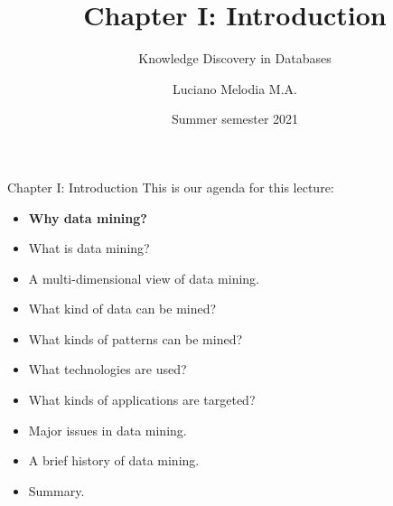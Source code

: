 \documentclass[aspectratio=169,t]{beamer}
\title[KDD]{Chapter I: Introduction}
\subtitle{Knowledge Discovery in Databases}
\author[L.~Melodia]{Luciano Melodia M.A.}
\institute[Department]{Evolutionary Data Management, Friedrich-Alexander University Erlangen-Nürnberg}
\date{Summer semester 2021}
\begin{document}
  \maketitle

  { 
    \begin{frame}{Chapter I: Introduction}
    This is our agenda for this lecture:
        \begin{itemize}
            \item \textbf{Why data mining?}
            \item What is data mining?
            \item A multi-dimensional view of data mining.
            \item What kind of data can be mined?
            \item What kinds of patterns can be mined?
            \item What technologies are used?
            \item What kinds of applications are targeted?
            \item Major issues in data mining.
            \item A brief history of data mining.
            \item Summary.
        \end{itemize}
    \end{frame}
  }
\end{document}
